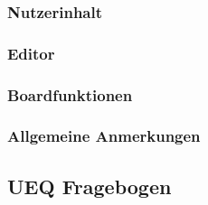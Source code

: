 
\subsubsection{Nutzerinhalt}\label{Nutzerinhalt}
\subsubsection{Editor}\label{Editor}
\subsubsection{Boardfunktionen}\label{Boardfunktionen}
\subsubsection{Allgemeine Anmerkungen}\label{Allgemeine Anmerkungen}







\subsection{UEQ Fragebogen}\label{UEQ Fragebogen}







